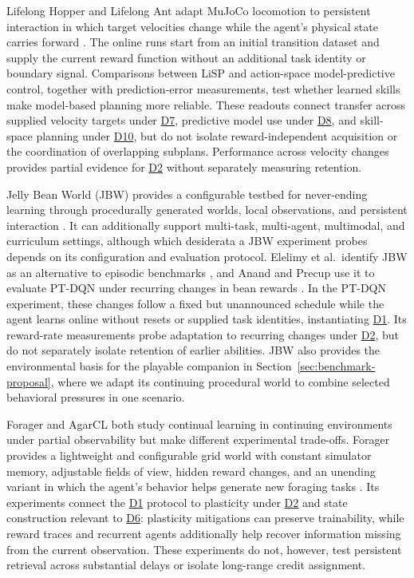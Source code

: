 \documentclass[10pt,journal,compsoc]{IEEEtran}
\DeclareRobustCommand{\Dref}[1]{\hyperref[sec:d#1]{D#1}}
\begin{document}
Lifelong Hopper and Lifelong Ant adapt MuJoCo locomotion to persistent interaction in which target velocities change while the agent's physical state carries forward \cite{lu2021}.
The online runs start from an initial transition dataset and supply the current reward function without an additional task identity or boundary signal.
Comparisons between LiSP and action-space model-predictive control, together with prediction-error measurements, test whether learned skills make model-based planning more reliable.
These readouts connect transfer across supplied velocity targets under \Dref{7}, predictive model use under \Dref{8}, and skill-space planning under \Dref{10}, but do not isolate reward-independent acquisition or the coordination of overlapping subplans.
Performance across velocity changes provides partial evidence for \Dref{2} without separately measuring retention.

Jelly Bean World (JBW) provides a configurable testbed for never-ending learning through procedurally generated worlds, local observations, and persistent interaction \cite{platanios2020}.
It can additionally support multi-task, multi-agent, multimodal, and curriculum settings, although which desiderata a JBW experiment probes depends on its configuration and evaluation protocol.
Elelimy et al.\ identify JBW as an alternative to episodic benchmarks \cite{elelimy2025}, and Anand and Precup use it to evaluate PT-DQN under recurring changes in bean rewards \cite{anand2023}.
In the PT-DQN experiment, these changes follow a fixed but unannounced schedule while the agent learns online without resets or supplied task identities, instantiating \Dref{1}.
Its reward-rate measurements probe adaptation to recurring changes under \Dref{2}, but do not separately isolate retention of earlier abilities.
JBW also provides the environmental basis for the playable companion in Section~\ref{sec:benchmark-proposal}, where we adapt its continuing procedural world to combine selected behavioral pressures in one scenario.

Forager and AgarCL both study continual learning in continuing environments under partial observability but make different experimental trade-offs.
Forager provides a lightweight and configurable grid world with constant simulator memory, adjustable fields of view, hidden reward changes, and an unending variant in which the agent's behavior helps generate new foraging tasks \cite{tang2026}.
Its experiments connect the \Dref{1} protocol to plasticity under \Dref{2} and state construction relevant to \Dref{6}: plasticity mitigations can preserve trainability, while reward traces and recurrent agents additionally help recover information missing from the current observation.
These experiments do not, however, test persistent retrieval across substantial delays or isolate long-range credit assignment.
\end{document}
